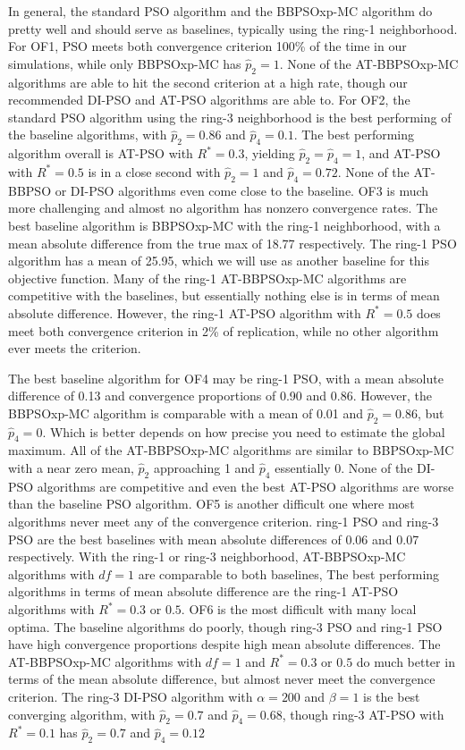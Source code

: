 \documentclass[12pt]{article}
\begin{document}
In general, the standard PSO algorithm and the BBPSOxp-MC algorithm do pretty well and should serve as baselines, typically using the ring-1 neighborhood. For OF1, PSO meets both convergence criterion 100\% of the time in our simulations, while only BBPSOxp-MC has $\widehat{p}_2=1$. None of the AT-BBPSOxp-MC algorithms are able to hit the second criterion at a high rate, though our recommended DI-PSO and AT-PSO algorithms are able to. For OF2, the standard PSO algorithm using the ring-3 neighborhood is the best performing of the baseline algorithms, with $\widehat{p}_2=0.86$ and $\widehat{p}_4=0.1$. The best performing algorithm overall is AT-PSO with $R^*=0.3$, yielding $\widehat{p}_2=\widehat{p}_4=1$, and AT-PSO with $R^*=0.5$ is in a close second with $\widehat{p}_2=1$ and $\widehat{p}_4=0.72$. None of the AT-BBPSO or DI-PSO algorithms even come close to the baseline. OF3 is much more challenging and almost no algorithm has nonzero convergence rates. The best baseline algorithm is BBPSOxp-MC with the ring-1 neighborhood, with a mean absolute difference from the true max of 18.77 respectively. The ring-1 PSO algorithm has a mean of 25.95, which we will use as another baseline for this objective function. Many of the ring-1 AT-BBPSOxp-MC algorithms are competitive with the baselines, but essentially nothing else is in terms of mean absolute difference. However, the ring-1 AT-PSO algorithm with $R^*=0.5$ does meet both convergence criterion in 2\% of replication, while no other algorithm ever meets the criterion. 

The best baseline algorithm for OF4 may be ring-1 PSO, with a mean absolute difference of 0.13 and convergence proportions of 0.90 and 0.86. However, the BBPSOxp-MC algorithm is comparable with a mean of 0.01 and $\widehat{p}_2=0.86$, but $\widehat{p}_4=0$. Which is better depends on how precise you need to estimate the global maximum. All of the AT-BBPSOxp-MC algorithms are similar to BBPSOxp-MC with a near zero mean, $\widehat{p}_2$ approaching 1 and $\widehat{p}_4$ essentially 0. None of the DI-PSO algorithms are competitive and even the best AT-PSO algorithms are worse than the baseline PSO algorithm. OF5 is another difficult one where most algorithms never meet any of the convergence criterion. ring-1 PSO and ring-3 PSO are the best baselines with mean absolute differences of 0.06 and 0.07 respectively. With the ring-1 or ring-3 neighborhood, AT-BBPSOxp-MC algorithms with $df=1$ are comparable to both baselines, The best performing algorithms in terms of mean absolute difference are the ring-1 AT-PSO algorithms with $R^*=0.3$ or $0.5$. OF6 is the most difficult with many local optima. The baseline algorithms do poorly, though ring-3 PSO and ring-1 PSO have high convergence proportions despite high mean absolute differences. The AT-BBPSOxp-MC algorithms with $df=1$ and $R^*=0.3$ or $0.5$ do much better in terms of the mean absolute difference, but almost never meet the convergence criterion. The ring-3 DI-PSO algorithm with $\alpha=200$ and $\beta=1$ is the best converging algorithm, with $\widehat{p}_2=0.7$ and $\widehat{p}_4=0.68$, though ring-3 AT-PSO with $R^*=0.1$ has $\widehat{p}_2=0.7$ and $\widehat{p}_4=0.12$
\end{document}
